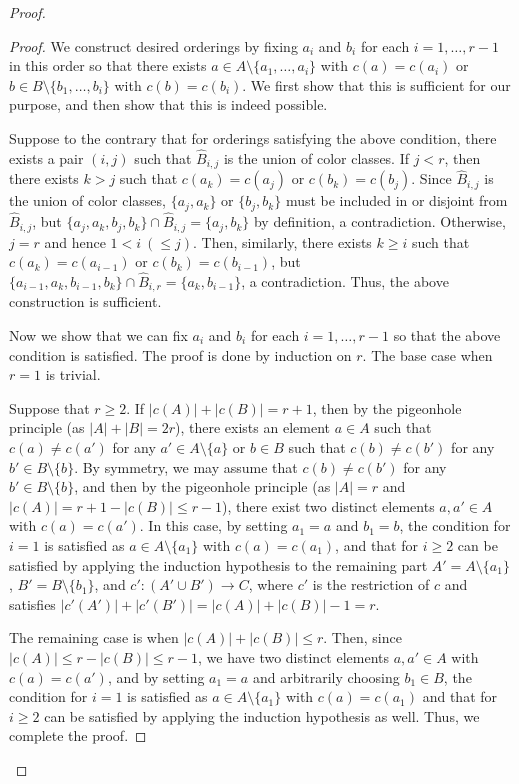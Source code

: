 \documentclass{article}
\theoremstyle{definition}
\begin{document}
\begin{proof}
\begin{proof}
    We construct desired orderings by fixing $a_i$ and $b_i$ for each $i = 1, \dotsc, r - 1$ in this order so that there exists $a \in A \setminus \{a_1, \dotsc, a_i\}$ with $c(a) = c(a_i)$ or $b \in B \setminus \{b_1, \dotsc, b_i\}$ with $c(b) = c(b_i)$.
    We first show that this is sufficient for our purpose, and then show that this is indeed possible.

    Suppose to the contrary that for orderings satisfying the above condition, there exists a pair $(i, j)$ such that $\hat{B}_{i,j}$ is the union of color classes.
    If $j < r$, then there exists $k > j$ such that $c(a_k) = c(a_j)$ or $c(b_k) = c(b_j)$.
    Since $\hat{B}_{i,j}$ is the union of color classes, $\{a_j, a_k\}$ or $\{b_j, b_k\}$ must be included in or disjoint from $\hat{B}_{i,j}$, but $\{a_j, a_k, b_j, b_k\} \cap \hat{B}_{i,j} = \{a_j, b_k\}$ by definition, a contradiction.
    Otherwise, $j = r$ and hence $1 < i \ (\le j)$.
    Then, similarly, there exists $k \ge i$ such that $c(a_k) = c(a_{i-1})$ or $c(b_k) = c(b_{i-1})$, but $\{a_{i-1}, a_k, b_{i-1}, b_k\} \cap \hat{B}_{i,r} = \{a_k, b_{i-1}\}$, a contradiction.
    Thus, the above construction is sufficient.

    Now we show that we can fix $a_i$ and $b_i$ for each $i = 1, \dotsc, r - 1$ so that the above condition is satisfied.
    The proof is done by induction on $r$.
    The base case when $r = 1$ is trivial.

    Suppose that $r \ge 2$.
    If $|c(A)| + |c(B)| = r + 1$, then by the pigeonhole principle (as $|A| + |B| = 2r$), there exists an element $a \in A$ such that $c(a) \neq c(a')$ for any $a' \in A \setminus \{a\}$ or $b \in B$ such that $c(b) \neq c(b')$ for any $b' \in B \setminus \{b\}$.
    By symmetry, we may assume that $c(b) \neq c(b')$ for any $b' \in B \setminus \{b\}$, and then by the pigeonhole principle (as $|A| = r$ and $|c(A)| = r + 1 - |c(B)| \le r - 1$), there exist two distinct elements $a, a' \in A$ with $c(a) = c(a')$.
    In this case, by setting $a_1 = a$ and $b_1 = b$, the condition for $i = 1$ is satisfied as $a \in A \setminus \{a_1\}$ with $c(a) = c(a_1)$, and that for $i \ge 2$ can be satisfied by applying the induction hypothesis to the remaining part $A' = A \setminus \{a_1\}$, $B' = B \setminus \{b_1\}$, and $c' \colon (A' \cup B') \to C$, where $c'$ is the restriction of $c$ and satisfies $|c'(A')| + |c'(B')| = |c(A)| + |c(B)| - 1 = r$.
    
    The remaining case is when $|c(A)| + |c(B)| \le r$.
    Then, since $|c(A)| \le r - |c(B)| \le r - 1$, we have two distinct elements $a, a' \in A$ with $c(a) = c(a')$, and by setting $a_1 = a$ and arbitrarily choosing $b_1 \in B$, the condition for $i = 1$ is satisfied as $a \in A \setminus \{a_1\}$ with $c(a) = c(a_1)$ and that for $i \ge 2$ can be satisfied by applying the induction hypothesis as well.
    Thus, we complete the proof.
\end{proof}


\end{proof}
\end{document}
